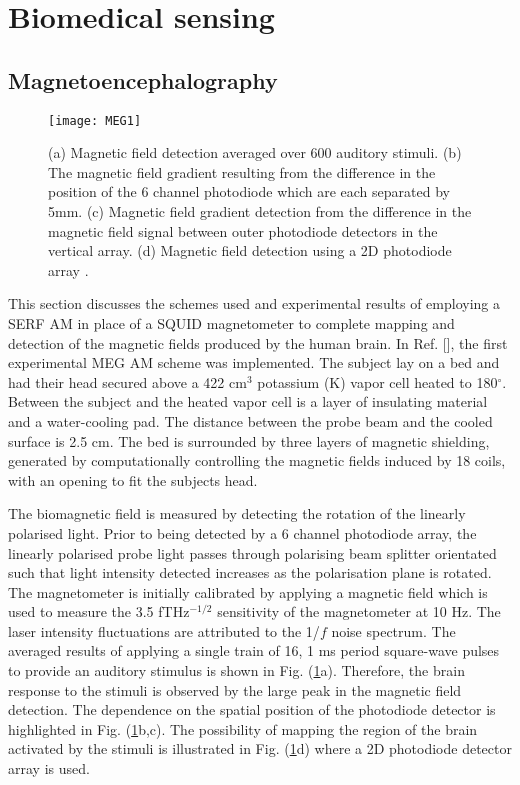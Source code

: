 \section{Biomedical sensing}
\subsection{\label{sec:level1}Magnetoencephalography}
\begin{figure}[b]
\centering
\texttt{[image: MEG1]}
\caption{\label{fig:MEG1} (a) Magnetic field detection averaged over 600 auditory stimuli. (b) The magnetic field gradient resulting from the difference in the position of the 6 channel photodiode which are each separated by 5mm. (c) Magnetic field gradient detection from the difference in the magnetic field signal between outer photodiode detectors in the vertical array. (d) Magnetic field detection using a 2D photodiode array \citep{XiaMagnetoencephalographyMagnetometer}.}
\end{figure}

This section discusses the schemes used and experimental results of employing a SERF AM in place of a SQUID magnetometer to complete mapping and detection of the magnetic fields produced by the human brain. In Ref. [], the first experimental MEG AM scheme was implemented. The subject lay on a bed and had their head secured above a 422 cm$^{3}$ potassium (K) vapor cell heated to 180$^{\circ}$. Between the subject and the heated vapor cell is a layer of insulating material and a water-cooling pad. The distance between the probe beam and the cooled surface is 2.5 cm. The bed is surrounded by three layers of magnetic shielding, generated by computationally controlling the magnetic fields induced by 18 coils, with an opening to fit the subjects head. 


The biomagnetic field is measured by detecting the rotation of the linearly polarised light. Prior to being detected by a 6 channel photodiode array, the linearly polarised probe light passes through polarising beam splitter orientated such that light intensity detected increases as the polarisation plane is rotated. The magnetometer is initially calibrated by applying a magnetic field which is used to measure the 3.5 fTHz$^{-1/2}$ sensitivity of the magnetometer at 10 Hz. The laser intensity fluctuations are attributed to the 1/$f$ noise spectrum. The averaged results of applying a single train of 16, 1 ms period square-wave pulses to provide an auditory stimulus is shown in Fig. (\ref{fig:MEG1}a). Therefore, the brain response to the stimuli is observed by the large peak in the magnetic field detection. The dependence on the spatial position of the photodiode detector is highlighted in Fig. (\ref{fig:MEG1}b,c). The possibility of mapping the region of the brain activated by the stimuli is illustrated in Fig. (\ref{fig:MEG1}d) where a 2D photodiode detector array is used.

